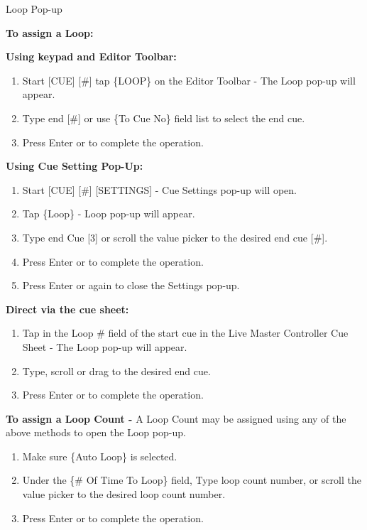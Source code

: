 \documentclass[
]{article}
\begin{document}
Loop Pop-up

\textbf{To assign a Loop:}

\textbf{Using keypad and Editor Toolbar:}

\begin{enumerate}
\def\labelenumi{\arabic{enumi}.}
\item
  Start {[}CUE{]} {[}\#{]} tap \{LOOP\} on the Editor Toolbar - The Loop pop-up will appear.
\item
  Type end {[}\#{]} or use \{To Cue No\} field list to select the end cue.
\item
  Press Enter or \href{image.png}{} to complete the operation.
\end{enumerate}

\textbf{Using Cue Setting Pop-Up:}

\begin{enumerate}
\def\labelenumi{\arabic{enumi}.}
\item
  Start {[}CUE{]} {[}\#{]} {[}SETTINGS{]} - Cue Settings pop-up will open.
\item
  Tap \{Loop\} - Loop pop-up will appear.
\item
  Type end Cue {[}3{]} or scroll the value picker to the desired end cue {[}\#{]}.
\item
  Press Enter or \href{image.png}{} to complete the operation.
\item
  Press Enter or \href{image.png}{} again to close the Settings pop-up.
\end{enumerate}

\textbf{Direct via the cue sheet:}

\begin{enumerate}
\def\labelenumi{\arabic{enumi}.}
\item
  Tap in the Loop \# field of the start cue in the Live Master Controller Cue Sheet - The Loop pop-up will appear.
\item
  Type, scroll or drag to the desired end cue.
\item
  Press Enter or to complete the operation.
\end{enumerate}

\textbf{To assign a Loop Count -} A Loop Count may be assigned using any of the above methods to open the Loop pop-up.

\begin{enumerate}
\def\labelenumi{\arabic{enumi}.}
\item
  Make sure \{Auto Loop\} is selected.
\item
  Under the \{\# Of Time To Loop\} field, Type loop count number, or scroll the value picker to the desired loop count number.
\item
  Press Enter or to complete the operation.
\end{enumerate}
\end{document}
